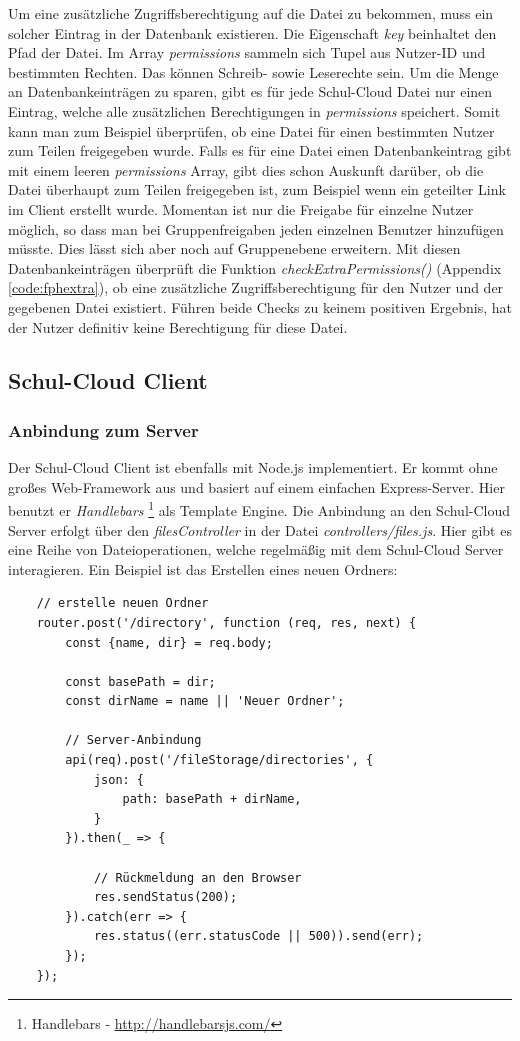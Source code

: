 Um eine zusätzliche Zugriffsberechtigung auf die Datei zu bekommen, muss ein solcher Eintrag in der Datenbank existieren. Die Eigenschaft \textit{key} beinhaltet den Pfad der Datei. Im Array \textit{permissions} sammeln sich Tupel aus Nutzer-ID und bestimmten Rechten. Das können Schreib- sowie Leserechte sein. Um die Menge an Datenbankeinträgen zu sparen, gibt es für jede Schul-Cloud Datei nur einen Eintrag, welche alle zusätzlichen Berechtigungen in \textit{permissions} speichert. Somit kann man zum Beispiel überprüfen, ob eine Datei für einen bestimmten Nutzer zum Teilen freigegeben wurde. Falls es für eine Datei einen Datenbankeintrag gibt mit einem leeren \textit{permissions} Array, gibt dies schon Auskunft darüber, ob die Datei überhaupt zum Teilen freigegeben ist, zum Beispiel wenn ein geteilter Link im Client erstellt wurde. Momentan ist nur die Freigabe für einzelne Nutzer möglich, so dass man bei Gruppenfreigaben jeden einzelnen Benutzer hinzufügen müsste. Dies lässt sich aber noch auf Gruppenebene erweitern. Mit diesen Datenbankeinträgen überprüft die Funktion \textit{checkExtraPermissions()} (Appendix \ref{code:fphextra}), ob eine zusätzliche Zugriffsberechtigung für den Nutzer und der gegebenen Datei existiert. Führen beide Checks zu keinem positiven Ergebnis, hat der Nutzer definitiv keine Berechtigung für diese Datei.

\subsection{Schul-Cloud Client}

\subsubsection{Anbindung zum Server}
Der Schul-Cloud Client ist ebenfalls mit Node.js implementiert. Er kommt ohne großes Web-Framework aus und basiert auf einem einfachen Express-Server. Hier benutzt er \textit{Handlebars} \footnote{Handlebars - \url{http://handlebarsjs.com/}} als Template Engine. Die Anbindung an den Schul-Cloud Server erfolgt über den \textit{filesController} in der  Datei \textit{controllers/files.js}. Hier gibt es eine Reihe von Dateioperationen, welche regelmäßig mit dem Schul-Cloud Server interagieren. Ein Beispiel ist das Erstellen eines neuen Ordners:

\begin{lstlisting}
	// erstelle neuen Ordner
	router.post('/directory', function (req, res, next) {
		const {name, dir} = req.body;
	
		const basePath = dir;
		const dirName = name || 'Neuer Ordner';
		
		// Server-Anbindung
		api(req).post('/fileStorage/directories', {
			json: {
				path: basePath + dirName,
			}
		}).then(_ => {
			
			// Rückmeldung an den Browser
			res.sendStatus(200);
		}).catch(err => {
			res.status((err.statusCode || 500)).send(err);
		});
	});
\end{lstlisting} 

